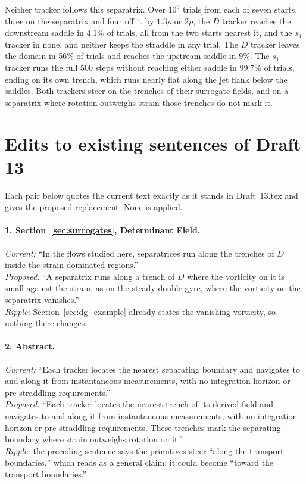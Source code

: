 \documentclass[11pt]{article}
\begin{document}
Neither tracker follows this separatrix. Over $10^3$ trials from each of
seven starts, three on the separatrix and four off it by $1.3\rho$ or
$2\rho$, the $D$ tracker reaches the downstream saddle in 4.1\% of trials,
all from the two starts nearest it, and the $s_1$ tracker in none, and
neither keeps the straddle in any trial. The $D$ tracker leaves the
domain in 56\% of trials and reaches the upstream saddle in 9\%. The $s_1$
tracker runs the full 500 steps without reaching either saddle in 99.7\%
of trials, ending on its own trench, which runs nearly flat along the jet
flank below the saddles. Both trackers steer on the trenches of their
surrogate fields, and on a separatrix where rotation outweighs strain
those trenches do not mark it.

\section{Edits to existing sentences of Draft 13}

Each pair below quotes the current text exactly as it stands in
Draft~13.tex and gives the proposed replacement. None is applied.

\paragraph{1. Section~\ref{sec:surrogates}, Determinant Field.}
\emph{Current:} ``In the flows studied here, separatrices run along the
trenches of $D$ inside the strain-dominated regions.''\\
\emph{Proposed:} ``A separatrix runs along a trench of $D$ where the
vorticity on it is small against the strain, as on the steady double
gyre, where the vorticity on the separatrix vanishes.''\\
\emph{Ripple:} Section~\ref{sec:dg_example} already states the vanishing
vorticity, so nothing there changes.

\paragraph{2. Abstract.}
\emph{Current:} ``Each tracker locates the nearest separating boundary
and navigates to and along it from instantaneous measurements, with no
integration horizon or pre-straddling requirements.''\\
\emph{Proposed:} ``Each tracker locates the nearest trench of its derived
field and navigates to and along it from instantaneous measurements, with
no integration horizon or pre-straddling requirements. These trenches
mark the separating boundary where strain outweighs rotation on it.''\\
\emph{Ripple:} the preceding sentence says the primitives steer ``along
the transport boundaries,'' which reads as a general claim; it could
become ``toward the transport boundaries.''
\end{document}
